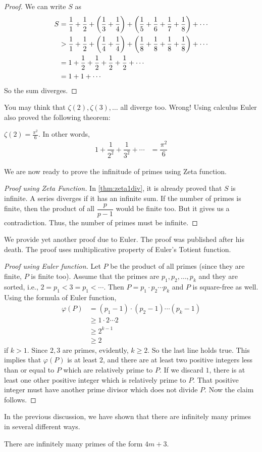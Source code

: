	\begin{proof}
		We can write $S$ as
			\begin{align*}
				S & =\dfrac11+ \dfrac12+ \left(\dfrac13+\dfrac14\right)+ \left(\dfrac15+\dfrac16+\dfrac17+\dfrac18\right)+\cdots\\
		  & > \dfrac11+\dfrac12+ \left(\dfrac14+\dfrac14\right) + \left(\dfrac18+\dfrac18+\dfrac18+\dfrac18\right)+\cdots\\
		  & =1+ \dfrac{1}{2}+ \dfrac{1}{2}+ \dfrac{1}{2}+ \dfrac{1}{2}+\cdots\\
		  & = 1+1+\cdots
			\end{align*}
		So the sum diverges.
	\end{proof}
You may think that $\zeta(2),\zeta(3),\ldots$ all diverge too. Wrong! Using calculus Euler also proved the following theorem:
	\begin{theorem}[Euler]\label{thm:zeta2}
		$\zeta(2)=\frac{\pi^2}{6}$. In other words,
			\begin{align*}
				1+\dfrac{1}{2^2}+\dfrac{1}{3^2}+\cdots & = \dfrac{\pi^2}{6}
			\end{align*}
	\end{theorem}
We are now ready to prove the infinitude of primes using Zeta function.
	\begin{proof}[Proof using Zeta Function]
		In \autoref{thm:zeta1div}, it is already proved that $S$ is infinite. A series diverges if it has an infinite sum. If the number of primes is finite, then the product of all $\dfrac p{p-1}$ would be finite too. But it gives us a contradiction. Thus, the number of primes must be infinite.
	\end{proof}
We provide yet another proof due to Euler. The proof was published after his death. The proof uses multiplicative property of Euler's Totient function.
	\begin{proof}[Proof using Euler function]
		Let $P$ be the product of all primes (since they are finite, $P$ is finite too). Assume that the primes are $p_1,p_2,\ldots, p_k$ and they are sorted, i.e., $2=p_1<3=p_1<\cdots$. Then $P = p_1\cdot p_2\cdots p_k$ and $P$ is square-free as well. Using the formula of Euler function,
			\begin{align*}
				\varphi(P)  & = (p_1-1)\cdot(p_2-1)\cdots(p_k-1)\\
						& \geq 1\cdot2\cdots2\\
						& \geq 2^{k-1}\\
						& \geq 2
			\end{align*}
		if $k>1$. Since $2,3$ are primes, evidently, $k\geq2$. So the last line holds true. This implies that $\varphi(P)$ is at least $2$, and there are at least two positive integers less than or equal to $P$ which are relatively prime to $P$. If we discard $1$, there is at least one other positive integer which is relatively prime to $P$. That positive integer must have another prime divisor which does not divide $P$. Now the claim follows.
	\end{proof}
In the previous discussion, we have shown that there are infinitely many primes in several different ways.
	\begin{theorem}
		There are infinitely many primes of the form $4m+3$.
	\end{theorem}

